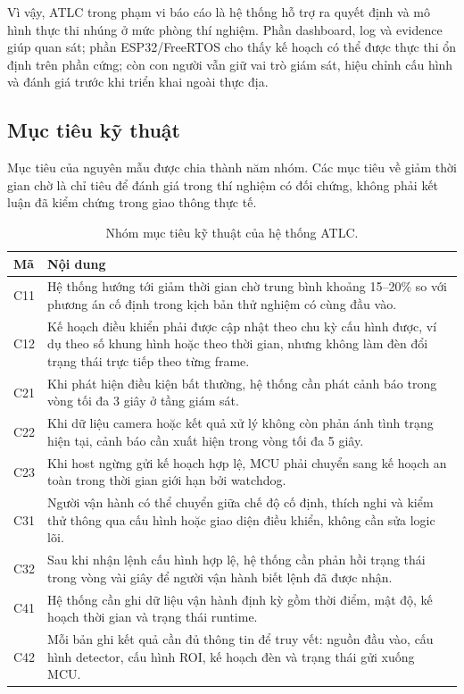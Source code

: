 Vì vậy, ATLC trong phạm vi báo cáo là hệ thống hỗ trợ ra quyết định và mô hình thực thi nhúng ở mức phòng thí nghiệm. Phần dashboard, log và evidence giúp quan sát; phần ESP32/FreeRTOS cho thấy kế hoạch có thể được thực thi ổn định trên phần cứng; còn con người vẫn giữ vai trò giám sát, hiệu chỉnh cấu hình và đánh giá trước khi triển khai ngoài thực địa.

\subsection{Mục tiêu kỹ thuật}

Mục tiêu của nguyên mẫu được chia thành năm nhóm. Các mục tiêu về giảm thời gian chờ là chỉ tiêu để đánh giá trong thí nghiệm có đối chứng, không phải kết luận đã kiểm chứng trong giao thông thực tế.

\begin{table}[H]
\centering
\caption{Nhóm mục tiêu kỹ thuật của hệ thống ATLC.}
\label{tab:technical-goals}
\footnotesize
\setlength{\tabcolsep}{4pt}
\renewcommand{\arraystretch}{1.16}
\begin{tabularx}{\linewidth}{C{1.2cm}Y}
\toprule
\textbf{Mã} & \textbf{Nội dung} \\
\midrule
C11 & Hệ thống hướng tới giảm thời gian chờ trung bình khoảng 15--20\% so với phương án cố định trong kịch bản thử nghiệm có cùng đầu vào. \\
C12 & Kế hoạch điều khiển phải được cập nhật theo chu kỳ cấu hình được, ví dụ theo số khung hình hoặc theo thời gian, nhưng không làm đèn đổi trạng thái trực tiếp theo từng frame. \\
C21 & Khi phát hiện điều kiện bất thường, hệ thống cần phát cảnh báo trong vòng tối đa 3 giây ở tầng giám sát. \\
C22 & Khi dữ liệu camera hoặc kết quả xử lý không còn phản ánh tình trạng hiện tại, cảnh báo cần xuất hiện trong vòng tối đa 5 giây. \\
C23 & Khi host ngừng gửi kế hoạch hợp lệ, MCU phải chuyển sang kế hoạch an toàn trong thời gian giới hạn bởi watchdog. \\
C31 & Người vận hành có thể chuyển giữa chế độ cố định, thích nghi và kiểm thử thông qua cấu hình hoặc giao diện điều khiển, không cần sửa logic lõi. \\
C32 & Sau khi nhận lệnh cấu hình hợp lệ, hệ thống cần phản hồi trạng thái trong vòng vài giây để người vận hành biết lệnh đã được nhận. \\
C41 & Hệ thống cần ghi dữ liệu vận hành định kỳ gồm thời điểm, mật độ, kế hoạch thời gian và trạng thái runtime. \\
C42 & Mỗi bản ghi kết quả cần đủ thông tin để truy vết: nguồn đầu vào, cấu hình detector, cấu hình ROI, kế hoạch đèn và trạng thái gửi xuống MCU. \\
\bottomrule
\end{tabularx}
\normalsize
\end{table}


